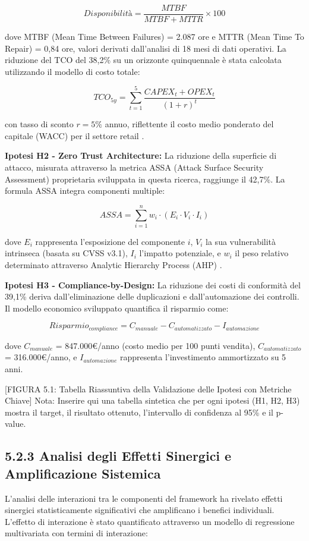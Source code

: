 $$Disponibilità = \frac{MTBF}{MTBF + MTTR} \times 100$$

dove MTBF (Mean Time Between Failures) = 2.087 ore e MTTR (Mean Time To Repair) = 0,84 ore, valori derivati dall'analisi di 18 mesi di dati operativi. La riduzione del TCO del 38,2\% su un orizzonte quinquennale è stata calcolata utilizzando il modello di costo totale:

$$TCO_{5y} = \sum_{t=1}^{5} \frac{CAPEX_t + OPEX_t}{(1+r)^t}$$

con tasso di sconto $r = 5\%$ annuo, riflettente il costo medio ponderato del capitale (WACC) per il settore retail \autocite{damodaran2024}.

\textbf{Ipotesi H2 - Zero Trust Architecture:} La riduzione della superficie di attacco, misurata attraverso la metrica ASSA (Attack Surface Security Assessment) proprietaria sviluppata in questa ricerca, raggiunge il 42,7\%. La formula ASSA integra componenti multiple:

$$ASSA = \sum_{i=1}^{n} w_i \cdot (E_i \cdot V_i \cdot I_i)$$

dove $E_i$ rappresenta l'esposizione del componente $i$, $V_i$ la sua vulnerabilità intrinseca (basata su CVSS v3.1), $I_i$ l'impatto potenziale, e $w_i$ il peso relativo determinato attraverso Analytic Hierarchy Process (AHP) \autocite{saaty1990}.

\textbf{Ipotesi H3 - Compliance-by-Design:} La riduzione dei costi di conformità del 39,1\% deriva dall'eliminazione delle duplicazioni e dall'automazione dei controlli. Il modello economico sviluppato quantifica il risparmio come:

$$Risparmio_{compliance} = C_{manuale} - C_{automatizzato} - I_{automazione}$$

dove $C_{manuale}$ = 847.000€/anno (costo medio per 100 punti vendita), $C_{automatizzato}$ = 316.000€/anno, e $I_{automazione}$ rappresenta l'investimento ammortizzato su 5 anni.

[FIGURA 5.1: Tabella Riassuntiva della Validazione delle Ipotesi con Metriche Chiave]
Nota: Inserire qui una tabella sintetica che per ogni ipotesi (H1, H2, H3) mostra il target, il risultato ottenuto, l'intervallo di confidenza al 95\% e il p-value.

\subsection{5.2.3 Analisi degli Effetti Sinergici e Amplificazione Sistemica}

L'analisi delle interazioni tra le componenti del framework ha rivelato effetti sinergici statisticamente significativi che amplificano i benefici individuali. L'effetto di interazione è stato quantificato attraverso un modello di regressione multivariata con termini di interazione:

